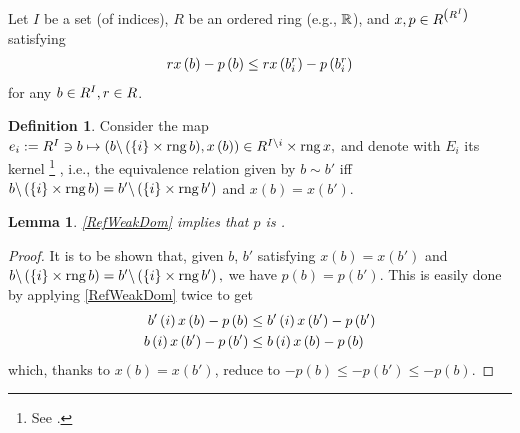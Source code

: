 \documentclass[oneside
]
{article}
\theoremstyle{plain}
\newtheorem{Lm}[Cor]{Lemma}
\theoremstyle{definition}
\newtheorem{Def}[Cor]{Definition}
\DeclareMathOperator{\rng}{rng}
\begin{document}
Let $I$ be a set (of indices), $R$ be an ordered ring (e.g., $\R{}$), and $x, p \in \mapsFromTo{
\left( 
\mapsFromTo{I}{R}
\right)
}{R}
$ satisfying 
\begin{align}
\label{RefWeakDom}
r \per x \left( b \right) - p \left( b \right) \leq r \per x \left( \alter{b}{i}{r} \right) - 
p \left( \alter {b}{i}{r} \right)
\end{align}
for any $b \in \mapsFromTo{I}{R}, r \in R$.

\begin{Def}
Consider the map 
$ \strip{i} := \mapsFromTo{I}{R} \ni b \mapsto 
\pair{b \sdiff \left( \left\{ i \right\} \cartprod \rng b \right)}{ x \left( b \right)} 
\in \mapsFromTo{I \sdiff {i}}{R} \cartprod \rng {x}, 
$
and denote with $E_i$ its kernel%
\footnote{See \WwwKernel{}.}%
, i.e., the equivalence relation given by $ b \sim b'$ iff 
$
b \sdiff \left( \left\{ i \right\} \cartprod \rng b \right)
=
b' \sdiff \left( \left\{ i \right\} \cartprod \rng b' \right)
$
and 
$ x \left( b \right) = x \left( b' \right)$.
\end{Def}

\begin{Lm}
\label{RefLmComp}
\eqref{RefWeakDom} implies that $p$ is .
\end{Lm}

\begin{proof}
It is to be shown that, given $b$, $b'$ satisfying $ x \left( b \right) = x \left( b' \right)$ and  
$ b \sdiff \left(\left\{ i \right\} \cartprod \rng b \right) = b' \sdiff \left( \left\{ i \right\} \cartprod \rng b' \right) , $ 
we have 
$ p \left( b \right) = p \left( b' \right)$. 
This is easily done by applying \eqref{RefWeakDom} twice to get 
\begin{align*}
b'\left( i \right) \per x \left( b \right) - p \left( b \right) 
& \leq 
b'\left( i \right) \per x \left( b' \right) - p \left( b' \right)
\\ 
b\left( i \right) \per x \left( b' \right) - p \left( b' \right) 
& \leq 
b\left( i \right) \per x \left( b \right) - p \left( b \right)
\end{align*}
which, thanks to $x \left( b \right) = x \left( b' \right)$, reduce to
$ -p \left( b \right) \leq -p \left( b' \right) \leq -p \left( b \right).$
\end{proof}


\end{document}
